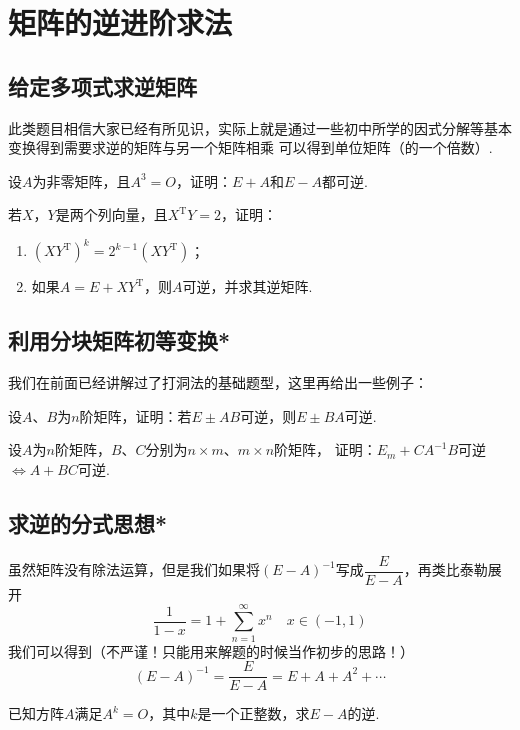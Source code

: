 \section{矩阵的逆进阶求法}
\subsection{给定多项式求逆矩阵}
此类题目相信大家已经有所见识，实际上就是通过一些初中所学的因式分解等基本变换得到需要求逆的矩阵与另一个矩阵相乘
可以得到单位矩阵（的一个倍数）.
\begin{example}
    设$A$为非零矩阵，且$A^3=O$，证明：$E+A$和$E-A$都可逆.
\end{example}

\begin{example}
    若$X$，$Y$是两个列向量，且$X^\mathrm{T}Y=2$，证明：
    \begin{enumerate}
        \item $(XY^\mathrm{T})^k=2^{k-1}(XY^{\mathrm{T}})$；

        \item 如果$A=E+XY^\mathrm{T}$，则$A$可逆，并求其逆矩阵.
    \end{enumerate}
\end{example}

\subsection{利用分块矩阵初等变换*}
我们在前面已经讲解过了打洞法的基础题型，这里再给出一些例子：
\begin{example}
    设$A$、$B$为$n$阶矩阵，证明：若$E\pm AB$可逆，则$E\pm BA$可逆.
\end{example}
\begin{example}
    设$A$为$n$阶矩阵，$B$、$C$分别为$n \times m$、$m \times n$阶矩阵，
    证明：$E_m+CA^{-1}B$可逆$\iff A+BC$可逆.
\end{example}

\subsection{求逆的分式思想*}
虽然矩阵没有除法运算，但是我们如果将$(E-A)^{-1}$写成$\dfrac{E}{E-A}$，再类比泰勒展开
\[\frac{1}{1-x}=1+\sum_{n=1}^\infty x^n \quad x\in (-1,1)\]我们可以得到（不严谨！只能用来解题的时候当作初步的思路！）
\[(E-A)^{-1}=\frac{E}{E-A}=E+A+A^2+\cdots\]

\begin{example}
    已知方阵$A$满足$A^k=O$，其中$k$是一个正整数，求$E-A$的逆.
\end{example}


